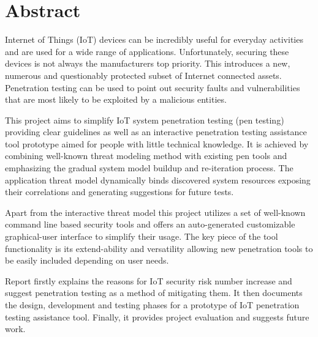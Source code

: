 


\section{Abstract}

Internet of Things (IoT) devices can be incredibly useful for everyday activities and are used for a wide range of applications. Unfortunately, securing these devices is not always the manufacturers top priority. This introduces a new, numerous and questionably protected subset of Internet connected assets. Penetration testing can be used to point out security faults and vulnerabilities that are most likely to be exploited by a malicious entities. 

This project aims to simplify IoT system penetration testing (pen testing) providing clear guidelines as well as an interactive penetration testing assistance tool prototype aimed for people with little technical knowledge. It is achieved by combining well-known threat modeling method with existing pen tools and emphasizing the gradual system model buildup and re-iteration process. The application threat model dynamically binds discovered system resources exposing their correlations and generating suggestions for future tests.

Apart from the interactive threat model this project utilizes a set of well-known command line based security tools and offers an auto-generated customizable graphical-user interface to simplify their usage. The key piece of the tool functionality is its extend-ability and versatility allowing new penetration tools to be easily included depending on user needs.

Report firstly explains the reasons for IoT security risk number increase and suggest penetration testing as a method of mitigating them. It then documents the design, development and testing phases for a prototype of IoT penetration testing assistance tool. Finally, it provides project evaluation and suggests future work.